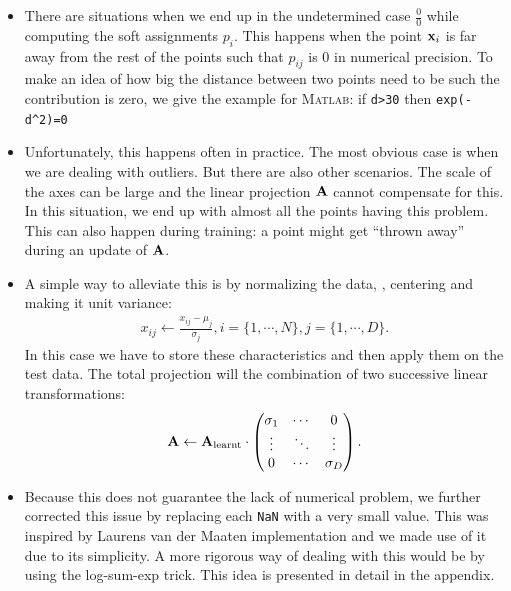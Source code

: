 \begin{itemize}
    \item There are situations when we end up in the
        undetermined case $\frac{0}{0}$ while computing the
        soft assignments $p_i$. This happens when the point
        $\mathbf{x}_i$ is far away from the rest of the points such
        that $p_{ij}$ is 0 in numerical precision. To make an
        idea of how big the distance between two points need
        to be such the contribution is zero, we give the
        example for \textsc{Matlab}: if \texttt{d>30} then
        \texttt{exp(-d\^{}2)=0}
    \item Unfortunately, this happens often in practice. The
        most obvious case is when we are dealing with
        outliers. But there are also other scenarios. The
        scale of the axes can be large and the linear
        projection $\mathbf{A}$ cannot compensate for this. In this
        situation, we end up with almost all the points having
        this problem. This can also happen during training: a
        point might get ``thrown away'' during an update of
        $\mathbf{A}$.
    \item A simple way to alleviate this is by normalizing the
        data, \ie, centering and making it unit variance:
        \begin{align}
            x_{ij} \leftarrow \frac{x_{ij} - \mu_j}{\sigma_j}, i =
\{1,\cdots,N\}, j = \{1,\cdots,D\}.
        \end{align}
        In this case we have to store these characteristics
        and then apply them on the test data. The total
        projection will the combination of two successive
        linear transformations:
        \begin{align}
            \mathbf{A} \leftarrow \mathbf{A}_{\text{learnt}}  \cdot \begin{pmatrix}
                  \sigma_1 &  \cdots & 0 \\
                  \vdots  &   \ddots & \vdots  \\
                  0 & \cdots & \sigma_D
                 \end{pmatrix}.
        \end{align}
    \item Because this does not guarantee the lack of
        numerical problem, we further corrected this issue by
        replacing each \texttt{NaN} with a very small value.
        This was inspired by Laurens van der Maaten
        implementation and we made use of it due to its
        simplicity. A more rigorous way of dealing with this
        would be by using the log-sum-exp trick. This idea is
        presented in detail in the appendix.

\end{itemize}

